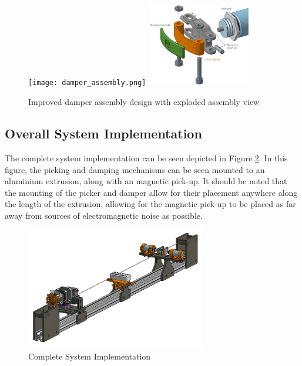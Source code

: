 \documentclass[a4paper,11pt]{article}
\begin{document}
\begin{figure}[h!]
  \begin{center}
    \texttt{[image: damper\_assembly.png]}
    \includegraphics[width=0.4\textwidth]{damper_explode.png}
    \caption{Improved damper assembly design with exploded assembly view}
  \end{center}
  \label{F:damp_assembly}
\end{figure}

\subsection{Overall System Implementation}

The complete system implementation can be seen depicted in Figure \ref{F:full_assembly}. In this figure, the picking and damping mechanisms can be seen mounted to an aluminium extrusion, along with an magnetic pick-up. It should be noted that the mounting of the picker and damper allow for their placement anywhere along the length of the extrusion, allowing for the magnetic pick-up to be placed as far away from sources of electromagnetic noise as possible.

\begin{figure}[h!]
  \begin{center}
    \includegraphics[width=0.7\textwidth]{picker_damper_full.png}
    \caption{Complete System Implementation}
  \end{center}
  \label{F:full_assembly}
  \vspace{-20pt}
\end{figure}
\end{document}
